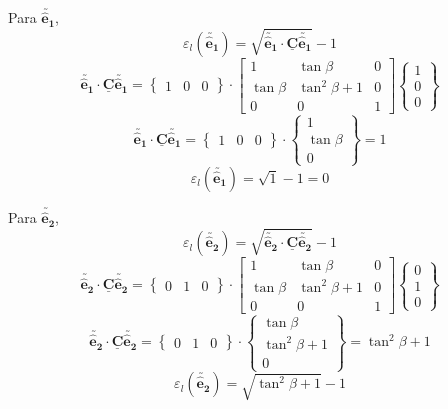 \begin{enumerate}
    Para $\utilde{\mathbf{\hat{e}_1}}$,
    \[\varepsilon_l(\utilde{\mathbf{\hat{e}_1}})=\sqrt{\utilde{\mathbf{\hat{e}_1}}\cdot\underline{\mathbf{C}}\utilde{\mathbf{\hat{e}_1}}}-1\]
    \[
        \utilde{\mathbf{\hat{e}_1}}\cdot\underline{\mathbf{C}}\utilde{\mathbf{\hat{e}_1}}
        =
        \begin{Bmatrix}
            1 & 0 & 0
        \end{Bmatrix}
        \cdot
        \begin{bmatrix}
            1 & \tan\beta & 0 \\
            \tan\beta & \tan^2\beta + 1 & 0 \\
            0 & 0 & 1
        \end{bmatrix}
        \begin{Bmatrix}
            1 \\ 0 \\ 0
        \end{Bmatrix}
    \]
    \[
        \utilde{\mathbf{\hat{e}_1}}\cdot\underline{\mathbf{C}}\utilde{\mathbf{\hat{e}_1}}
        =
        \begin{Bmatrix}
            1 & 0 & 0
        \end{Bmatrix}
        \cdot
        \begin{Bmatrix}
            1 \\ \tan\beta \\ 0
        \end{Bmatrix}
        =
        1
    \]
    \[\varepsilon_l(\utilde{\mathbf{\hat{e}_1}})=\sqrt{1}-1=0\]

    Para $\utilde{\mathbf{\hat{e}_2}}$,
    \[\varepsilon_l(\utilde{\mathbf{\hat{e}_2}})=\sqrt{\utilde{\mathbf{\hat{e}_2}}\cdot\underline{\mathbf{C}}\utilde{\mathbf{\hat{e}_2}}}-1\]
    \[
        \utilde{\mathbf{\hat{e}_2}}\cdot\underline{\mathbf{C}}\utilde{\mathbf{\hat{e}_2}}
        =
        \begin{Bmatrix}
            0 & 1 & 0
        \end{Bmatrix}
        \cdot
        \begin{bmatrix}
            1 & \tan\beta & 0 \\
            \tan\beta & \tan^2\beta + 1 & 0 \\
            0 & 0 & 1
        \end{bmatrix}
        \begin{Bmatrix}
            0 \\ 1 \\ 0
        \end{Bmatrix}
    \]
    \[
        \utilde{\mathbf{\hat{e}_2}}\cdot\underline{\mathbf{C}}\utilde{\mathbf{\hat{e}_2}}
        =
        \begin{Bmatrix}
            0 & 1 & 0
        \end{Bmatrix}
        \cdot
        \begin{Bmatrix}
            \tan\beta \\ \tan^2\beta + 1 \\ 0
        \end{Bmatrix}
        =
        \tan^2\beta + 1
    \]
    \[\varepsilon_l(\utilde{\mathbf{\hat{e}_2}})=\sqrt{\tan^2\beta + 1}-1\]


\end{enumerate}
